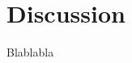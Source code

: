 \documentclass[
a4paper,     %
12pt         %
]{scrartcl}  %
\begin{document}
\section{Discussion}

Blablabla



% 

% 
\end{document}
